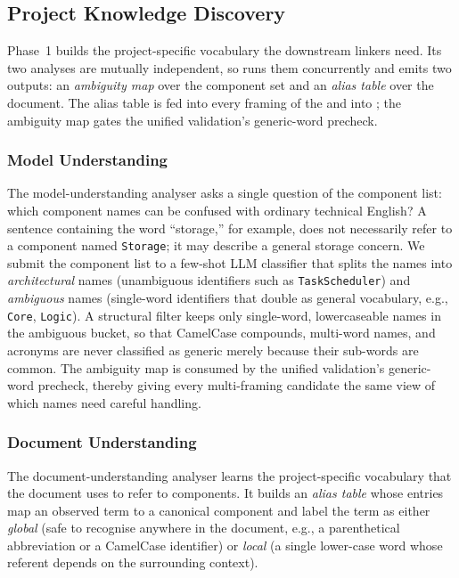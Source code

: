 \subsection{Project Knowledge Discovery}\label{sec:knowledge}

Phase~1 builds the project-specific vocabulary the downstream
linkers need.
Its two analyses are mutually independent, so \approach runs them
concurrently and emits two outputs: an \emph{ambiguity map} over the
component set and an \emph{alias table} over the document.
The alias table is fed into every framing of the \multiframing and
into \coref; the ambiguity map gates the unified validation's
generic-word precheck.

\subsubsection{Model Understanding}\label{sec:model-understanding}

The model-understanding analyser asks a single question of the
component list: which component names can be confused with ordinary
technical English?
A sentence containing the word ``storage,'' for example, does not
necessarily refer to a component named \texttt{Storage}; it may
describe a general storage concern.
We submit the component list to a few-shot LLM classifier that splits
the names into \emph{architectural} names (unambiguous identifiers
such as \texttt{TaskScheduler}) and \emph{ambiguous} names
(single-word identifiers that double as general vocabulary,
e.g., \texttt{Core}, \texttt{Logic}).
A structural filter keeps only single-word, lowercaseable names in
the ambiguous bucket, so that CamelCase compounds, multi-word names,
and acronyms are never classified as generic merely because their
sub-words are common.
The ambiguity map is consumed by the unified validation's
generic-word precheck, thereby giving every multi-framing candidate
the same view of which names need careful handling.

\subsubsection{Document Understanding}\label{sec:doc-understanding}

The document-understanding analyser learns the project-specific
vocabulary that the document uses to refer to components.
It builds an \emph{alias table} whose entries map an observed term
to a canonical component and label the term as either \emph{global}
(safe to recognise anywhere in the document, e.g., a parenthetical
abbreviation or a CamelCase identifier) or \emph{local} (a single
lower-case word whose referent depends on the surrounding context).

